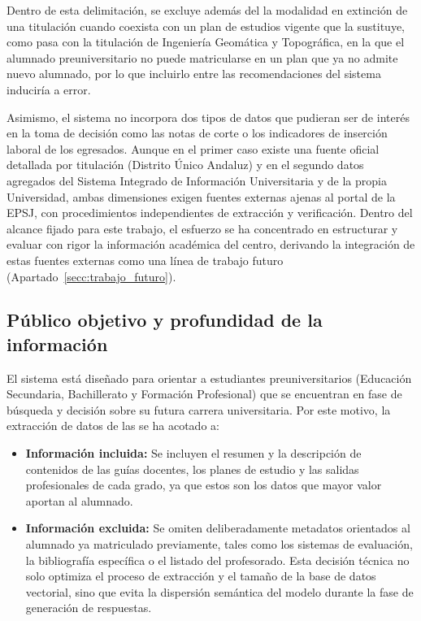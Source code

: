 Dentro de esta delimitación, se excluye además del  la modalidad en extinción de una titulación cuando coexista con un plan de estudios vigente que la sustituye, como pasa con la titulación de Ingeniería Geomática y Topográfica, en la que el alumnado preuniversitario no puede matricularse en un plan que ya no admite nuevo alumnado, por lo que incluirlo entre las recomendaciones del sistema induciría a error.

Asimismo, el sistema no incorpora dos tipos de datos que pudieran ser de interés en la toma de decisión como las notas de corte o los indicadores de inserción laboral de los egresados. Aunque en el primer caso existe una fuente oficial detallada por titulación (Distrito Único Andaluz) y en el segundo datos agregados del Sistema Integrado de Información Universitaria y de la propia Universidad, ambas dimensiones exigen fuentes externas ajenas al portal de la EPSJ, con procedimientos independientes de extracción y verificación. Dentro del alcance fijado para este trabajo, el esfuerzo se ha concentrado en estructurar y evaluar con rigor la información académica del centro, derivando la integración de estas fuentes externas como una línea de trabajo futuro (Apartado~\ref{secc:trabajo_futuro}).


\subsection{Público objetivo y profundidad de la información}
El sistema está diseñado para orientar a estudiantes preuniversitarios (Educación Secundaria, Bachillerato y Formación Profesional) que se encuentran en fase de búsqueda y decisión sobre su futura carrera universitaria. Por este motivo, la extracción de datos de las  se ha acotado a:
\begin{itemize}        
  \item \textbf{Información incluida:} Se incluyen el resumen y la descripción de contenidos de las guías docentes, los planes de estudio y las salidas profesionales de cada grado, ya que estos son los datos que mayor valor aportan al alumnado.
  \item \textbf{Información excluida:} Se omiten deliberadamente metadatos orientados al alumnado ya matriculado previamente, tales como los sistemas de evaluación, la bibliografía específica o el listado del profesorado. Esta decisión técnica no solo optimiza el proceso de extracción y el tamaño de la base de datos vectorial, sino que evita la dispersión semántica del modelo durante la fase de generación de respuestas.
\end{itemize}

